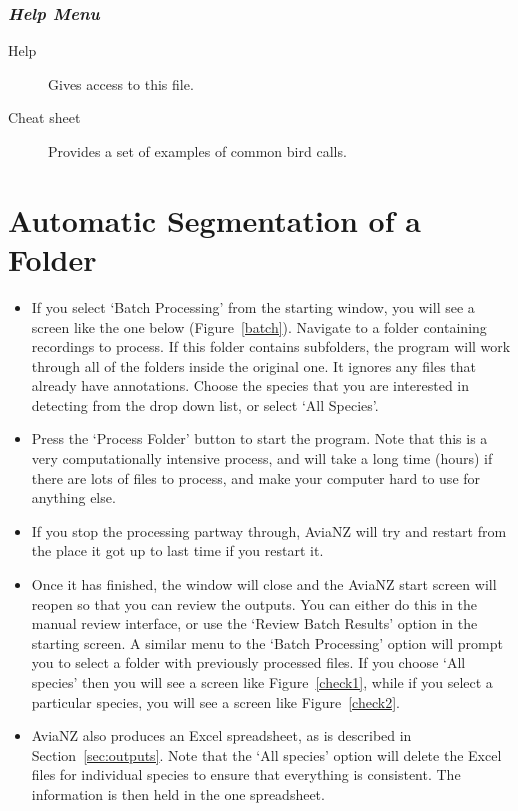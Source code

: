 \documentclass{article}
\begin{document}
\subsubsection{{\em Help Menu}}

\begin{description}
\item [Help] Gives access to this file.
\item [Cheat sheet] Provides a set of examples of common bird calls. 
\end{description}


\section{Automatic Segmentation of a Folder}
\label{sec:auto}

\begin{itemize}
\item If you select `Batch Processing' from the starting window, you will see a screen like the one below (Figure~\ref{batch}). Navigate to a folder containing recordings to process. If this folder contains subfolders, the program will work through all of the folders inside the original one. It ignores any files that already have annotations. Choose the species that you are interested in detecting from the drop down list, or select `All Species'. 

\item Press the `Process Folder' button to start the program. Note that this is a very computationally intensive process, and will take a long time (hours) if there are lots of files to process, and make your computer hard to use for anything else. 

\item If you stop the processing partway through, AviaNZ will try and restart from the place it got up to last time if you restart it.

\item Once it has finished, the window will close and the AviaNZ start screen will reopen so that you can review the outputs. You can either do this in the manual review interface, or use the `Review Batch Results' option in the starting screen. A similar menu to the `Batch Processing' option will prompt you to select a folder with previously processed files. If you choose `All species' then you will see a screen like Figure~\ref{check1}, while if you select a particular species, you will see a screen like Figure~\ref{check2}. 

\item AviaNZ also produces an Excel spreadsheet, as is described in Section~\ref{sec:outputs}. Note that the `All species' option will delete the Excel files for individual species to ensure that everything is consistent. The information is then held in the one spreadsheet.  
\end{itemize}
	
\end{document}
